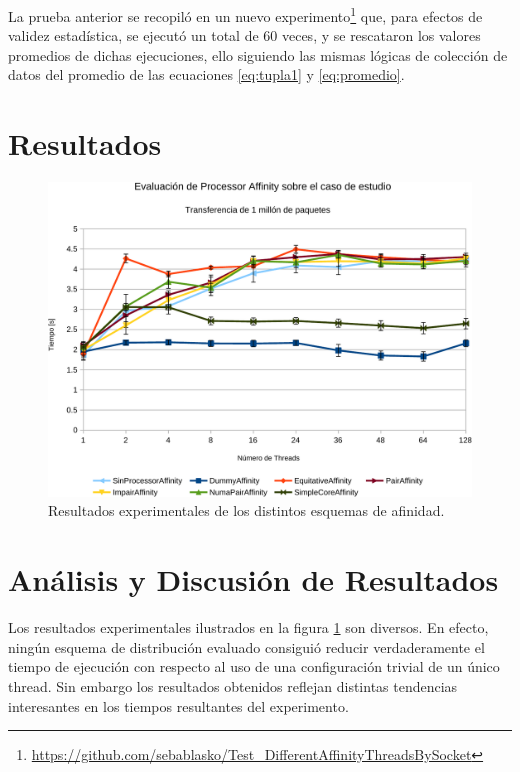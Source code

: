 La prueba anterior se recopiló en un nuevo experimento\footnote{\url{https://github.com/sebablasko/Test_DifferentAffinityThreadsBySocket}} que, para efectos de validez estadística, se ejecutó un total de 60 veces, y se rescataron los valores promedios de dichas ejecuciones, ello siguiendo las mismas lógicas de colección de datos del promedio de las ecuaciones \ref{eq:tupla1} y \ref{eq:promedio}.

\newpage

\section{Resultados}

\begin{figure}[h!]
	\centering
	\includegraphics[scale=.6]{resultados/processoraffinity-crop.pdf}
	\caption{Resultados experimentales de los distintos esquemas de afinidad.}
	\label{fig:resAffinity}
\end{figure}

\section{Análisis y Discusión de Resultados}
Los resultados experimentales ilustrados en la figura \ref{fig:resAffinity} son diversos. En efecto, ningún esquema de distribución evaluado consiguió reducir verdaderamente el tiempo de ejecución con respecto al uso de una configuración trivial de un único thread. Sin embargo los resultados obtenidos reflejan distintas tendencias interesantes en los tiempos resultantes del experimento.

